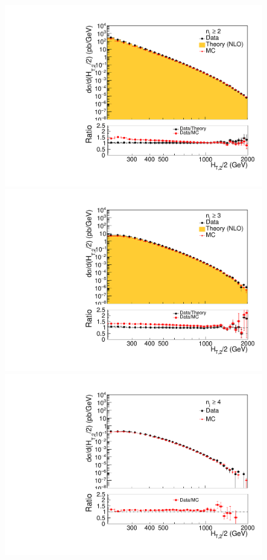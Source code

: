 \begin{figure}[!htbp]
  \begin{center}
    \includegraphics[scale = 0.35]{Plots_HT_2_150/Comparison_all_2_HT_2_150.pdf}%
    \hspace{4mm}
    \includegraphics[scale = 0.35]{Plots_HT_2_150/Comparison_all_3_HT_2_150.pdf}\\
    \includegraphics[scale = 0.35]{Plots_HT_2_150/Comparison_all_4_HT_2_150.pdf}

\end{center}
\end{figure}
